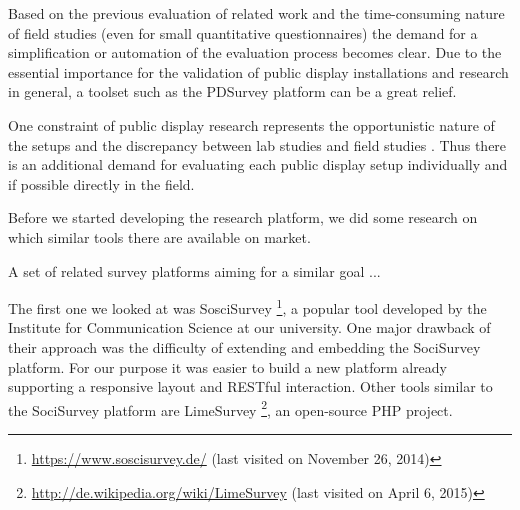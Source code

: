 	Based on the previous evaluation of related work and the time-consuming nature of field studies (even for small quantitative questionnaires) the demand for a simplification or automation of the evaluation process becomes clear. Due to the essential importance for the validation of public display installations and research in general, a toolset such as the PDSurvey platform can be a great relief. 

	One constraint of public display research represents the opportunistic nature of the setups and the discrepancy between lab studies and field studies \cite{Ojala2011}. Thus there is an additional demand for evaluating each public display setup individually and if possible directly in the field.








	Before we started developing the research platform, we did some research on which similar tools there are available on market. 



	A set of related survey platforms aiming for a similar goal ...

	The first one we looked at was SosciSurvey \footnote{\url{https://www.soscisurvey.de/} (last visited on November 26, 2014)}, a popular tool developed by the Institute for Communication Science at our university. One major drawback of their approach was the difficulty of extending and embedding the SociSurvey platform. For our purpose it was easier to build a new platform already supporting a responsive layout and RESTful interaction. Other tools similar to the SociSurvey platform are LimeSurvey \footnote{\url{http://de.wikipedia.org/wiki/LimeSurvey} (last visited on April 6, 2015)}, an open-source PHP project.


